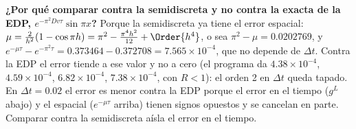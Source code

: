 
\begin{ojo}
\textbf{¿Por qué comparar contra la semidiscreta y no contra la exacta de la EDP,
$e^{-\pi^2 D v\tau}\sin\pi x$?} Porque la semidiscreta ya tiene el error espacial:
$\mu = \frac{2}{h^2}(1 - \cos\pi h) = \pi^2 - \frac{\pi^4h^2}{12} + \Order{h^4}$, o sea $\pi^2 - \mu = 0.0202769$, y
$e^{-\mu\tau} - e^{-\pi^2\tau} = 0.373464 - 0.372708 = 7.565\times10^{-4}$, que no depende de $\Delta t$. Contra la
EDP el error tiende a ese valor y no a cero (el programa da $4.38\times10^{-4}$, $4.59\times10^{-4}$,
$6.82\times10^{-4}$, $7.38\times10^{-4}$, con $R < 1$): el orden 2 en $\Delta t$ queda tapado. En $\Delta t = 0.02$ el
error es menor contra la EDP porque el error en el tiempo ($g^L$ abajo) y el espacial ($e^{-\mu\tau}$ arriba)
tienen signos opuestos y se cancelan en parte. Comparar contra la semidiscreta aísla el error en el tiempo.
\end{ojo}
